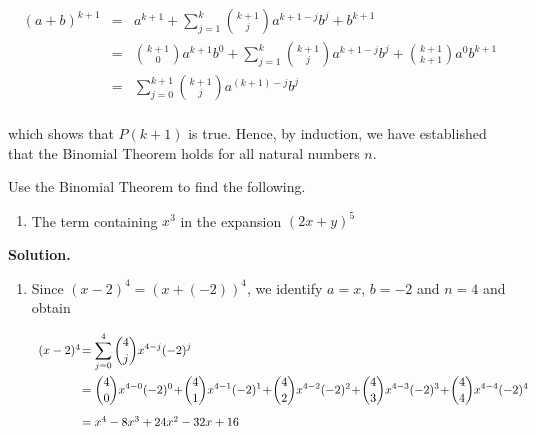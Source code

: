 \[ \begin{array}{rcl}

(a+b)^{k+1} & = & a^{k+1} + \displaystyle{\sum_{j=1}^{k} \binom{k+1}{j} a^{k+1-j} b^{j} } + b^{k+1} \\ [15pt]
            & = & \displaystyle{ \binom{k+1}{0} a^{k+1} b^{0} + \sum_{j=1}^{k} \binom{k+1}{j} a^{k+1-j} b^{j}  + \binom{k+1}{k+1} a^{0} b^{k+1}} \\ [15pt]
            & = & \displaystyle{  \sum_{j=0}^{k+1} \binom{k+1}{j} a^{(k+1)-j} b^{j}} \\ [15pt]
 \end{array}\]
 
which shows that $P(k+1)$ is true.  Hence, by induction, we have established that the Binomial Theorem holds for all natural numbers $n$.

\begin{ex} \label{binomialthmex}  Use the Binomial Theorem to find the following.

\begin{enumerate}


\item  The term containing $x^3$ in the expansion $(2x+y)^{5}$

\end{enumerate}

{\bf Solution.}
\begin{enumerate}
\item  Since $(x-2)^4 = (x+(-2))^4$, we identify $a = x$, $b = -2$ and $n=4$ and obtain

\[ \begin{array}{rcl}

(x-2)^4\! &\hspace{-.1in} =  & \hspace{-.1in}\displaystyle{\sum_{j=0}^{4} \binom{4}{j} x^{4-j} (-2)^{j}} \\ [15pt]
        & \hspace{-.1in} =  & \hspace{-.1in}\displaystyle{\binom{4}{0} x^{4-0} (-2)^{0} \!+\! \binom{4}{1} x^{4-1} (-2)^{1} \!+\! \binom{4}{2} x^{4-2} (-2)^{2} \!+\! \binom{4}{3} x^{4-3} (-2)^{3} \!+\! \binom{4}{4} x^{4-4} (-2)^{4}} \\ [15pt]
        &\hspace{-.1in}  =  & \hspace{-.1in}x^4 -8x^3 + 24x^2 - 32x + 16 \\
\end{array} \]


\end{enumerate}
\end{ex}
